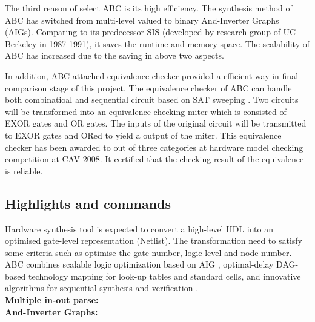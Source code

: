 The third reason of select ABC is its high efficiency. The synthesis method of ABC has switched from multi-level valued to binary And-Inverter Graphs (AIGs). Comparing to its predecessor SIS (developed by research group of UC Berkeley in 1987-1991\cite{ABC}), it saves the runtime and memory space. The scalability of ABC has increased due to the saving in above two aspects.

In addition, ABC attached equivalence checker provided a efficient way in final comparison stage of this project. The equivalence checker of ABC can handle both combinatioal and sequential circuit based on SAT sweeping \cite{satsweep,kuehlmann2001circuit}. Two circuits will be transformed into an equivalence checking miter which is consisted of EXOR gates and OR gates. 
The inputs of the original circuit will be transmitted to EXOR gates and ORed to yield a output of the miter. This equivalence checker has been awarded to out of three categories at hardware model checking competition at CAV 2008. It certified that the checking result of the equivalence is reliable.

\subsection{Highlights and commands}%
Hardware synthesis tool is expected to convert a high-level HDL into an optimised gate-level representation (Netlist). The transformation need to satisfy some criteria such as optimise the gate number, logic level and node number. ABC combines scalable logic optimization based on AIG , optimal-delay DAG-based technology mapping for look-up tables and standard cells, and innovative algorithms for sequential synthesis and verification \cite{ABC}.\\
\textbf{Multiple in-out parse:}\\
\textbf{And-Inverter Graphs:}



